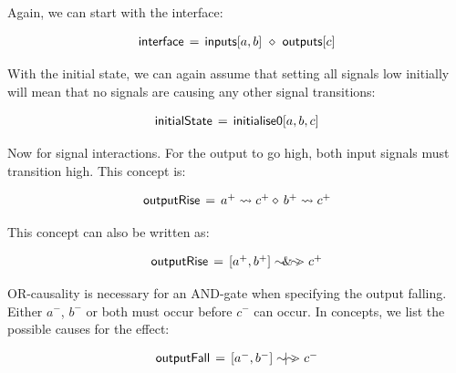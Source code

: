 \documentclass[british,conference,compsoc]{IEEEtran}
\begin{document}
\noindent Again, we can start with the interface: 

\[
\begin{array}{lcl}
\mathsf{interface}&\hspace{-2mm}=&\hspace{-2mm}\mathsf{inputs}[a, b]~\diamond~\mathsf{outputs}[c]
\end{array}
\]

\noindent With the initial state, we can again assume that setting all signals low initially will mean 
that no signals are causing any other signal transitions:

\[
\begin{array}{lcl}
\mathsf{initialState}&\hspace{-2mm}=&\hspace{-2mm}\mathsf{initialise0} [a, b, c]
\end{array}
\]

\noindent Now for signal interactions. For the output to go high, both input signals must
transition high. This concept is: 

\[
\begin{array}{lcl}
\mathsf{outputRise}&\hspace{-2mm}=&\hspace{-2mm}a^{+} \rightsquigarrow c^{+} \diamond\, b^{+} \rightsquigarrow c^{+}
\end{array}
\]

\noindent This concept can also be written as:

\[
\begin{array}{lcl}
\mathsf{outputRise}&\hspace{-2mm}=&\hspace{-2mm}[a^{+}, b^{+}] \sim\hspace{-1.5mm}\&\hspace{-1.5mm}\sim\hspace{-1.5mm}> c^{+} 
\end{array}
\]

\noindent OR-causality is necessary for an AND-gate when specifying the output falling. Either $a^{-}$,
$b^{-}$ or both must occur before $c^{-}$ can occur. In concepts, we list the possible
causes for the effect:

\[
\begin{array}{lcl}
\mathsf{outputFall}&\hspace{-2mm}=&\hspace{-2mm}[a^{-}, b^{-}] \sim\hspace{-1.5mm}|\hspace{-1.5mm}\sim\hspace{-1.5mm}> c^{-} 
\end{array}
\]
\end{document}
